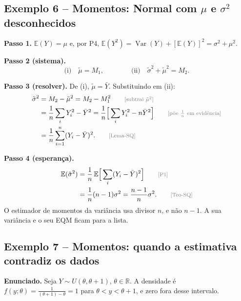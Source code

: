 \documentclass[11pt,a4paper]{article}
\theoremstyle{definition}
\theoremstyle{plain}
\newcommand{\E}{\mathbb{E}}
\newcommand{\Var}{\operatorname{Var}}
\newcommand{\R}{\mathbb{R}}
\newcommand{\bY}{\bar{Y}}
\newcommand{\just}[1]{\tag*{\footnotesize\textcolor{gray}{[#1]}}}
\begin{document}
\subsection{Exemplo 6 -- Momentos: Normal com $\mu$ e $\sigma^2$ desconhecidos}\label{ex:normalmm}

\textbf{Passo 1.} $\E(Y)=\mu$ e, por P4, $\E(Y^2)=\Var(Y)+[\E(Y)]^2=\sigma^2+\mu^2$.

\textbf{Passo 2 (sistema).}
\[
\text{(i)}\quad\tilde\mu=M_1,\qquad\qquad\text{(ii)}\quad\tilde\sigma^2+\tilde\mu^2=M_2 .
\]

\textbf{Passo 3 (resolver).} De (i), $\tilde\mu=\bY$. Substituindo em (ii):
\begin{align*}
\tilde\sigma^2&=M_2-\tilde\mu^2=M_2-M_1^2 \just{subtrai $\tilde\mu^2$}\\
&=\frac1n\sum_iY_i^2-\bY^2
=\frac1n\Big[\sum_iY_i^2-n\bY^2\Big] \just{põe $\frac1n$ em evidência}\\
&=\frac1n\sum_{i=1}^n(Y_i-\bY)^2 . \just{Lema-SQ}
\end{align*}

\textbf{Passo 4 (esperança).}
\begin{align*}
\E(\tilde\sigma^2)&=\frac1n\,\E\Big[\sum_i(Y_i-\bY)^2\Big] \just{P1}\\
&=\frac1n(n-1)\sigma^2=\frac{n-1}{n}\sigma^2 . \just{Teo-SQ}
\end{align*}
O estimador de momentos da variância usa divisor $n$, e não $n-1$. A sua variância e o seu EQM ficam para a lista.

\subsection{Exemplo 7 -- Momentos: quando a estimativa contradiz os dados}\label{ex:unifdesloc}

\textbf{Enunciado.} Seja $Y\sim U(\theta,\theta+1)$, $\theta\in\R$. A densidade é $f(y;\theta)=\frac{1}{(\theta+1)-\theta}=1$ para $\theta<y<\theta+1$, e zero fora desse intervalo.
\end{document}
